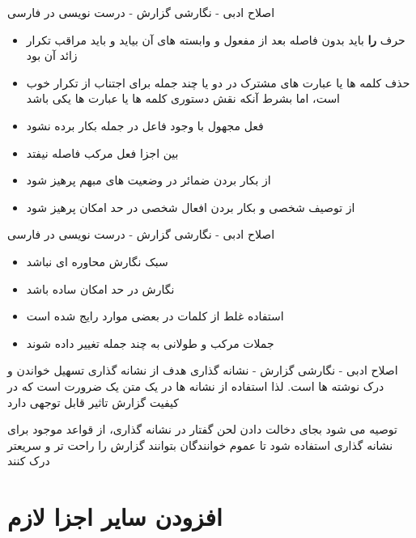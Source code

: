 \documentclass[14pt]{beamer}
\makeatletter
\newcommand{\rtlist}{\raggedleft\rightskip\@totalleftmargin}
\newcommand{\sectionfontsize}{\fontsize{22pt}{0pt}\selectfont}
\newcommand{\framefontsizelarge}{\fontsize{18pt}{0pt}\selectfont}
\newcommand{\frametitlefontsize}{\fontsize{20pt}{0pt}\selectfont}
\makeatother
\begin{document}
\begin{persian}
	\begin{frame}[plain]{\frametitlefontsize اصلاح ادبی - نگارشی گزارش - درست نویسی در فارسی}
		\framefontsizelarge
		\begin{itemize}\rtlist
			\item حرف \textbf{را} باید بدون فاصله بعد از مفعول و وابسته های آن بیاید و باید مراقب تکرار زائد آن بود
			\item حذف کلمه ها یا عبارت های مشترک در دو یا چند جمله برای اجتناب از تکرار خوب است، اما بشرط آنکه نقش دستوری کلمه ها یا عبارت ها یکی باشد
			\item فعل مجهول با وجود فاعل در جمله بکار برده نشود
			\item بین اجزا فعل مرکب فاصله نیفتد
			\item از بکار بردن ضمائر در وضعیت های مبهم پرهیز شود
			\item از توصیف شخصی و بکار بردن افعال شخصی در حد امکان پرهیز شود
		\end{itemize}
	\end{frame}	
	
	\begin{frame}[plain]{\frametitlefontsize اصلاح ادبی - نگارشی گزارش - درست نویسی در فارسی}
		\framefontsizelarge
		\begin{itemize}\rtlist
			\item سبک نگارش محاوره ای نباشد
			\item نگارش در حد امکان ساده باشد
			\item استفاده غلط از کلمات در بعضی موارد رایج شده است
			\item جملات مرکب و طولانی به چند جمله تغییر داده شوند
		\end{itemize}
	\end{frame}	
	
	\begin{frame}[plain]{\frametitlefontsize اصلاح ادبی - نگارشی گزارش - نشانه گذاری}
		\framefontsizelarge
		هدف از نشانه گذاری تسهیل خواندن و درک نوشته ها است. لذا استفاده از نشانه ها در یک متن یک ضرورت است که در کیفیت گزارش تاثیر قابل توجهی دارد
		
		توصیه می شود بجای دخالت دادن لحن گفتار در نشانه گذاری، از قواعد موجود برای نشانه گذاری استفاده شود تا عموم خوانندگان بتوانند گزارش را راحت تر و سریعتر درک کنند
	\end{frame}	
	
	\section{\sectionfontsize افزودن سایر اجزا لازم}
	

\end{persian}
\end{document}
